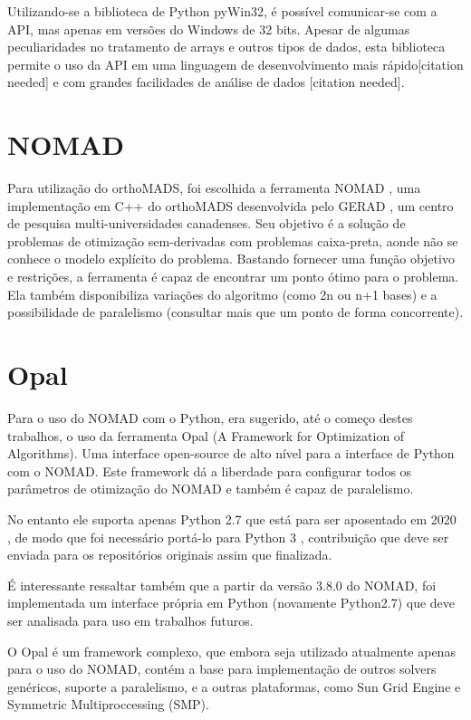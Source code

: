  Utilizando-se a biblioteca de Python pyWin32, é possível comunicar-se com a API, mas apenas em versões do Windows de 32 bits. Apesar de algumas peculiaridades no tratamento de arrays e outros tipos de dados, esta biblioteca permite o uso da API em uma linguagem de desenvolvimento mais rápido[citation needed] e com grandes facilidades de análise de dados [citation needed].

\section{NOMAD}
Para utilização do orthoMADS, foi escolhida a ferramenta NOMAD \cite{Nomad}, uma implementação em C++ do orthoMADS desenvolvida pelo GERAD \cite{gerad}, um centro de pesquisa multi-universidades canadenses.
%
Seu objetivo é a solução de problemas de otimização sem-derivadas com problemas caixa-preta, aonde não se conhece o modelo explícito do problema.
%
Bastando fornecer uma função objetivo e restrições, a ferramenta é capaz de encontrar um ponto ótimo para o problema.
Ela também disponibiliza variações do algoritmo (como 2n ou n+1 bases) e a possibilidade de paralelismo (consultar mais que um ponto de forma concorrente).  

	

\section{Opal}
Para o uso do NOMAD com o Python, era sugerido, até o começo destes trabalhos, o uso da ferramenta Opal \cite{opal} (A Framework for Optimization of Algorithms). Uma interface open-source de alto nível para a interface de Python com o NOMAD. Este framework dá a liberdade para configurar todos os parâmetros de otimização do NOMAD e também é capaz de paralelismo.

No entanto ele suporta apenas Python 2.7 que está para ser aposentado em 2020 \cite{python27sched}, de modo que foi necessário portá-lo para Python 3 \cite{opalPython3}, contribuição que deve ser enviada para os repositórios originais assim que finalizada.

É interessante ressaltar também que a partir da versão 3.8.0 do NOMAD, foi implementada um interface própria em Python (novamente Python2.7) que deve ser analisada para uso em trabalhos futuros.

O Opal é um framework complexo, que embora seja utilizado atualmente apenas para o uso do NOMAD, contém a base para implementação de outros solvers genéricos, suporte a paralelismo, e a outras plataformas, como Sun Grid Engine e Symmetric Multiproccessing (SMP).


